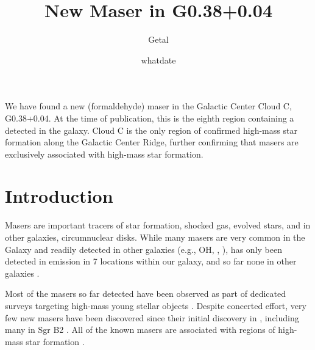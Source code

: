 \documentclass{aa}
\begin{document}
 


   \title{New \formaldehyde Maser in G0.38+0.04}

   \subtitle{}

   \author{Getal}


   \date{whatdate}

 
  \abstract
   {We have found a new \formaldehyde \oneone (formaldehyde) maser in the Galactic
Center Cloud C, G0.38+0.04.  At the time of publication, this is the eighth
region containing a \formaldehyde detected in the galaxy.  Cloud C is the only
region of confirmed high-mass star formation along the Galactic Center Ridge,
further confirming that \formaldehyde masers are exclusively associated with high-mass
star formation.
}

   \keywords{  }

   \maketitle




\section{Introduction}
Masers are important tracers of star formation, shocked gas, evolved stars, and
in other galaxies, circumnuclear disks.  While many masers are very common in
the Galaxy and readily detected in other galaxies (e.g., OH, \methanol,
\water), \formaldehyde has only been detected in emission in 7 locations within
our galaxy, and so far none in other galaxies \citep{Araya2007c,Mangum2008a}.

Most of the \formaldehyde masers so far detected have been observed as part of
dedicated surveys targeting high-mass young stellar objects
\citep{Araya2004a,Araya2007b,Araya2008a}.  Despite concerted effort, very few
new masers have been discovered since their initial discovery in
\citet{Forster1980a}, including many in Sgr B2
\citep{Whiteoak1983a,Mehringer1994b}.  All of the known \formaldehyde masers
are associated with regions of high-mass star formation
\citep{Pratap1994a,Araya2004a,Araya2007b,Araya2008a}.
\end{document}
